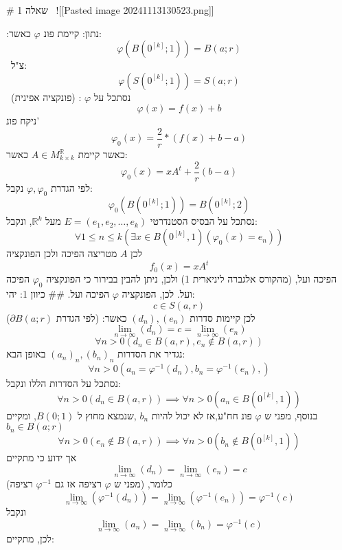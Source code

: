 # שאלה 1 
![[Pasted image 20241113130523.png]]

 :נתון:
 קיימת פונ $\varphi$ כאשר:
 $$\varphi(B(0^{[k]};1)) = B(a;r)$$
 צ"ל:
 $$\varphi(S(0^{[k]};1)) = S(a;r)$$
 נסתכל על $\varphi$ : (פונקציה אפינית)
$$\varphi(x) = f(x) + b$$
ניקח פונ' 
$$\varphi_{0}(x) = \frac{2}{r}*(f(x) + b - a)$$
כאשר קיימת $A\in M^{\mathbb{R}}_{k\times k}$ כאשר:
$$\varphi_{0}(x) = xA^t+\frac{2}{r}(b-a)$$
לפי הגדרת $\varphi, \varphi_{0}$ נקבל:
$$\varphi_{0}(B(0^{[k]};1)) = B(0^{[k]};2)$$
נסתכל על הבסיס הסטנדרטי $E=(e_{1},e_{2},\dots,e_{k})$ מעל $\mathbb{R}^{k}$, ונקבל:
$$\forall 1\leq n\leq k(\exists x \in B(0^{[k]},1)(\varphi_{0}(x)=e_{n}))$$
לכן $A$ מטריצה הפיכה ולכן הפונקציה
$$f_{0}(x) = xA^t$$
הפיכה ועל, (מהקורס אלגברה ליניארית 1) 
ולכן, ניתן להבין בבירור כי הפונקציה $\varphi_{0}$ הפיכה ועל.
לכן, הפונקציה $\varphi$ הפיכה ועל.
## כיוון 1:
יהי:
$$ c \in S(a,r)$$
לכן קיימות סדרות $(d_{n}),(e_{n})$  כאשר: (לפי הגדרת $\partial B(a;r)$)
$$ \lim_{ n \to \infty } {(d_{n})} = c = \lim_{ n \to \infty } {(e_{n})} $$
$$ \forall n>0 (d_{n} \in B(a,r),e_{n} \notin B(a,r)) $$
נגדיר את הסדרות $(a_{n})_{n},(b_{n})_{n}$ באופן הבא:
$$\forall n>0(a_{n}=\varphi^{-1}(d_{n}),b_{n}=\varphi^{-1}(e_{n}),)$$
נסתכל על הסדרות הללו ונקבל: 
$$\forall n>0(d_{n} \in B(a,r)) \implies \forall n>0(a_{n} \in B(0^{[k]},1))$$
בנוסף, מפני ש $\varphi$ פונ חח"ע,אז לא יכול להיות $b_n$ ,שנמצא מחוץ ל $B(0;1)$, ומקיים $b_n \in B(a;r)$
$$\forall n>0(e_{n} \notin B(a,r)) \implies \forall n>0(b_{n} \notin B(0^{[k]},1))$$
אך ידוע כי מתקיים
$$\lim_{ n \to \infty }(d_{n})=\lim_{ n \to \infty } (e_{n})=c $$
כלומר, (מפני ש $\varphi$ רציפה אז גם $\varphi^{-1}$ רציפה)
$$\lim_{ n \to \infty }(\varphi^{-1}(d_{n})) = \lim_{ n \to \infty }(\varphi^{-1}(e_{n})) = \varphi^{-1}(c)$$
ונקבל
$$\lim_{ n \to \infty } (a_{n}) = \lim_{ n \to \infty }(b_{n}) = \varphi^{-1}(c) $$
לכן, מתקיים:

